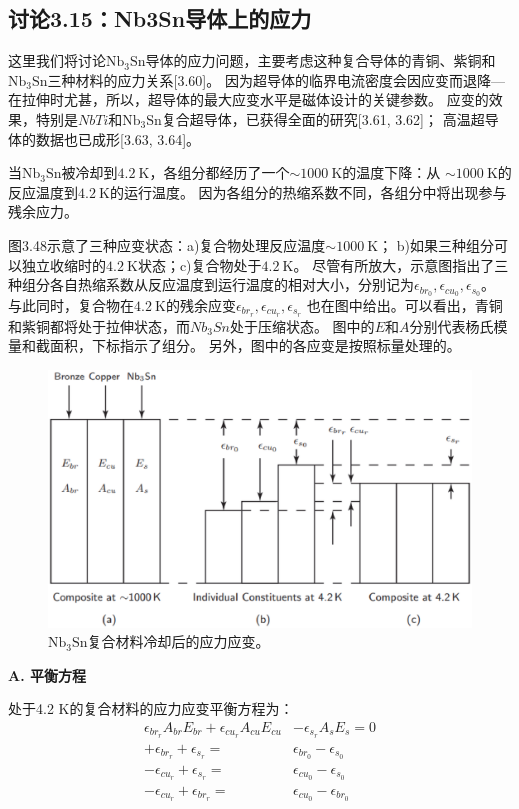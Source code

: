 \subsection{讨论3.15：Nb3Sn导体上的应力}
这里我们将讨论$\mathrm{Nb_3Sn}$导体的应力问题，主要考虑这种复合导体的青铜、紫铜和$\mathrm{Nb_3Sn}$三种材料的应力关系[3.60]。
因为超导体的临界电流密度会因应变而退降---在拉伸时尤甚，所以，超导体的最大应变水平是磁体设计的关键参数。
应变的效果，特别是$NbTi$和$\mathrm{Nb_3Sn}$复合超导体，已获得全面的研究[3.61, 3.62]；
高温超导体的数据也已成形[3.63, 3.64]。

当$\mathrm{Nb_3Sn}$被冷却到$4.2\ \mathrm{K}$，各组分都经历了一个$\sim 1000\ \mathrm{K}$的温度下降：从
$\sim 1000\ \mathrm{K}$的反应温度到$4.2\ \mathrm{K}$的运行温度。
因为各组分的热缩系数不同，各组分中将出现参与残余应力。

图3.48示意了三种应变状态：a)复合物处理反应温度$\sim 1000\ \mathrm{K}$；
b)如果三种组分可以独立收缩时的$4.2\ \mathrm{K}$状态；c)复合物处于$4.2\ \mathrm{K}$。
尽管有所放大，示意图指出了三种组分各自热缩系数从反应温度到运行温度的相对大小，分别记为$\epsilon_{br_0},\epsilon_{cu_0}, \epsilon_{s_0}$。
与此同时，复合物在$4.2\ \mathrm{K}$的残余应变$\epsilon_{br_r},\epsilon_{cu_r}, \epsilon_{s_r}$
也在图中给出。可以看出，青铜和紫铜都将处于拉伸状态，而$Nb_3Sn$处于压缩状态。
图中的$E$和$A$分别代表杨氏模量和截面积，下标指示了组分。
另外，图中的各应变是按照标量处理的。
\begin{figure}[htbp]
	\centering
	\includegraphics[scale=0.5]{chpt3/figs/fig3.48.eps}
	\caption{$\mathrm{Nb_3Sn}$复合材料冷却后的应力应变。}
\end{figure}

\textbf{A. 平衡方程}

处于4.2 K的复合材料的应力应变平衡方程为：
\begin{subequations}%
	\begin{align}
\epsilon_{br_r}A_{br}E_{br}+\epsilon_{cu_r}A_{cu}E_{cu}&-\epsilon_{s_r}A_sE_s=0\\
+\epsilon_{br_r}+\epsilon_{s_r}=&\epsilon_{br_0}-\epsilon_{s_0}\\
-\epsilon_{cu_r}+\epsilon_{s_r}=&\epsilon_{cu_0}-\epsilon_{s_0}\\
-\epsilon_{cu_r}+\epsilon_{br_r}=&\epsilon_{cu_0}-\epsilon_{br_0}
	\end{align}
\end{subequations}

